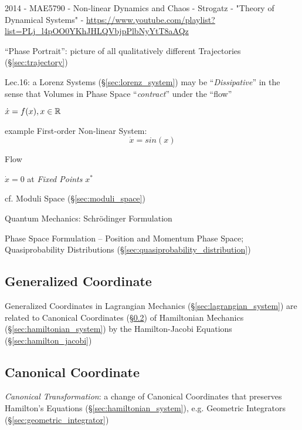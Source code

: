 2014 - MAE5790 - Non-linear Dynamics and Chaos - Strogatz - "Theory of
Dynamical Systems" -
\url{https://www.youtube.com/playlist?list=PLj_l4pOO0YKhJHLQVbjpPlbNyYtT8aAQz}

``Phase Portrait'': picture of all qualitatively different Trajectories
(\S\ref{sec:trajectory})

Lec.16: a Lorenz Systems (\S\ref{sec:lorenz_system}) may be
``\emph{Dissipative}'' in the sense that Volumes in Phase Space
``\emph{contract}'' under the ``flow''

$\dot{x} = f(x), x \in \mathbb{R}$

example First-order Non-linear System:
\[
  \dot{x} = sin(x)
\]

Flow

$\dot{x} = 0$ at \emph{Fixed Points} $x^*$

cf. Moduli Space (\S\ref{sec:moduli_space})


\asterism


Quantum Mechanics: Schr\"odinger Formulation

Phase Space Formulation -- Position and Momentum Phase Space; Quasiprobability
Distributions (\S\ref{sec:quasiprobability_distribution})



\subsection{Generalized Coordinate}\label{sec:generalized_coordinate}

Generalized Coordinates in Lagrangian Mechanics (\S\ref{sec:lagrangian_system})
are related to Canonical Coordinates (\S\ref{sec:canonical_coordinate}) of
Hamiltonian Mechanics (\S\ref{sec:hamiltonian_system}) by the Hamilton-Jacobi
Equations (\S\ref{sec:hamilton_jacobi})



\subsection{Canonical Coordinate}\label{sec:canonical_coordinate}

\emph{Canonical Transformation}: a change of Canonical Coordinates that
preserves Hamilton's Equations (\S\ref{sec:hamiltonian_system}), e.g. Geometric
Integrators (\S\ref{sec:geometric_integrator})

